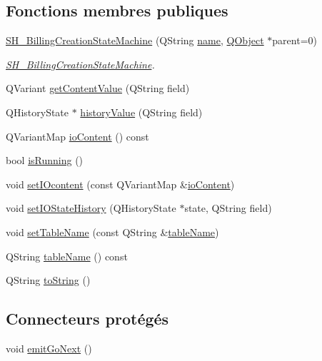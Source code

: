 \subsection*{Fonctions membres publiques}
\begin{DoxyCompactItemize}
\item 
\hyperlink{classSH__BillingCreationStateMachine_ad62b77fa4aeafe200056ff3974562f83}{S\-H\-\_\-\-Billing\-Creation\-State\-Machine} (Q\-String \hyperlink{classSH__NamedObject_a9f686c6f2a5bcc08ad03d0cee0151f0f}{name}, \hyperlink{classQObject}{Q\-Object} $\ast$parent=0)
\begin{DoxyCompactList}\small\item\em \hyperlink{classSH__BillingCreationStateMachine}{S\-H\-\_\-\-Billing\-Creation\-State\-Machine}. \end{DoxyCompactList}\item 
Q\-Variant \hyperlink{classSH__InOutStateMachine_aa1a3bd3c0ea8a59b9bc916dc718eb9ca}{get\-Content\-Value} (Q\-String field)
\item 
Q\-History\-State $\ast$ \hyperlink{classSH__InOutStateMachine_af71bfdb3b59b7bf2763588b513b4205f}{history\-Value} (Q\-String field)
\item 
Q\-Variant\-Map \hyperlink{classSH__InOutStateMachine_aaca105fbd5f5cc3bac115389ad3694c5}{io\-Content} () const 
\item 
bool \hyperlink{classSH__GenericStateMachine_a7e650d582a4c1b8cf2869fb5873b36a9}{is\-Running} ()
\item 
void \hyperlink{classSH__InOutStateMachine_a8271a7ec7d5f6502449dd3b4da5f4155}{set\-I\-Ocontent} (const Q\-Variant\-Map \&\hyperlink{classSH__InOutStateMachine_aaca105fbd5f5cc3bac115389ad3694c5}{io\-Content})
\item 
void \hyperlink{classSH__InOutStateMachine_acbcce2c4300af1634d928b30e5e9be1c}{set\-I\-O\-State\-History} (Q\-History\-State $\ast$state, Q\-String field)
\item 
void \hyperlink{classSH__InOutStateMachine_a95db31a7e7f31f36a8737adc739ab08c}{set\-Table\-Name} (const Q\-String \&\hyperlink{classSH__InOutStateMachine_a4288a6c86ddf83effefff886675591c9}{table\-Name})
\item 
Q\-String \hyperlink{classSH__InOutStateMachine_a4288a6c86ddf83effefff886675591c9}{table\-Name} () const 
\item 
Q\-String \hyperlink{classSH__GenericStateMachine_a85c0c1c9d258ae991f84667412fa47cd}{to\-String} ()
\end{DoxyCompactItemize}
\subsection*{Connecteurs protégés}
\begin{DoxyCompactItemize}
\item 
void \hyperlink{classSH__GenericStateMachine_a2e162a1da1f694d433cb9072b37ac530}{emit\-Go\-Next} ()
\end{DoxyCompactItemize}
